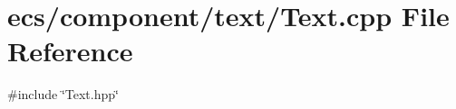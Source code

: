 \section{ecs/component/text/\+Text.cpp File Reference}
\label{_text_8cpp}
{\ttfamily \#include \char`\"{}Text.\+hpp\char`\"{}}\newline
